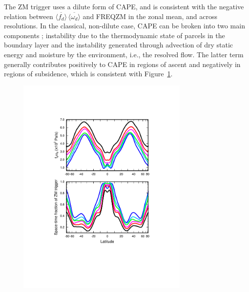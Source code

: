 {The ZM trigger uses a dilute form of CAPE, and is consistent with the negative relation between $\overline{\langle f_{d} \rangle} \, \overline{\langle \omega_{d} \rangle}$ and FREQZM in the zonal mean, and across resolutions. In the classical, non-dilute case, CAPE can be broken into two main components \citep{Z2002JGR}; instability due to the thermodynamic state of parcels in the boundary layer and the instability generated through advection of dry static energy and moisture by the environment, i.e., the resolved flow. The latter term generally contributes positively to CAPE in regions of ascent and negatively in regions of subsidence, which is consistent with Figure~\ref{fig:vomg}.

\begin{figure}[t]
\begin{center}
\noindent\includegraphics[width=20pc,angle=0]{chapter6/temp_zonal_fracd*vomgd.pdf}\\
\end{center}
\caption{}
\label{fig:vomg}
\end{figure}

}
